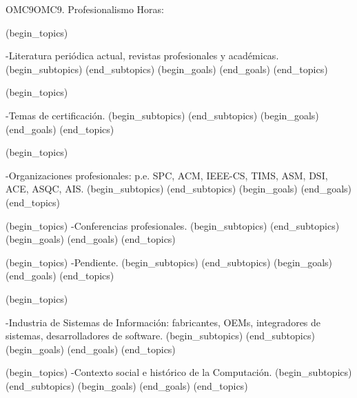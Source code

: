 \begin{BKL2}{OMC9}{OMC9. Profesionalismo}
Horas:
 
(begin_topics)

-Literatura periódica actual, revistas profesionales y académicas.
(begin_subtopics)
(end_subtopics)
(begin_goals)
(end_goals)
(end_topics)

 

(begin_topics)

-Temas de certificación.
(begin_subtopics)
(end_subtopics)
(begin_goals)
(end_goals)
(end_topics)

 

(begin_topics)

-Organizaciones profesionales: p.e. SPC, ACM, IEEE-CS, TIMS, ASM, DSI, ACE,  ASQC, AIS.
(begin_subtopics)
(end_subtopics)
(begin_goals)
(end_goals)
(end_topics)

 

(begin_topics)
-Conferencias profesionales.
(begin_subtopics)
(end_subtopics)
(begin_goals)
(end_goals)
(end_topics)

 

(begin_topics)
-Pendiente.
(begin_subtopics)
(end_subtopics)
(begin_goals)
(end_goals)
(end_topics)

(begin_topics)

-Industria de Sistemas de Información: fabricantes, OEMs, integradores de sistemas, desarrolladores de software.
(begin_subtopics)
(end_subtopics)
(begin_goals)
(end_goals)
(end_topics)

 

(begin_topics)
-Contexto social e histórico de la Computación.
(begin_subtopics)
(end_subtopics)
(begin_goals)
(end_goals)
(end_topics)

\end{BKL2}



